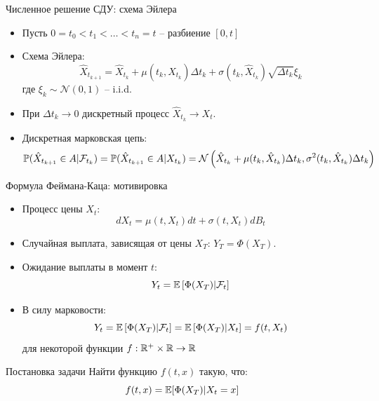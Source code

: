 \documentclass[aspectratio=169]{beamer}
\begin{document}
\begin{frame}{Численное решение СДУ: схема Эйлера}
    
    \begin{itemize}
        \item Пусть $0 = t_0 < t_1 < \ldots < t_n = t$ -- разбиение $[0, t]$
        \item Схема Эйлера:
        $$
            \hat{X}_{t_{k + 1}} = \hat{X}_{t_k} + \mu(t_k, \hat{X}_{t_k}) \Delta t_k + \sigma(t_k, \hat{X}_{t_k}) \sqrt{\Delta t_k} \xi_k
        $$
        где $\xi_k \sim \mathcal{N}(0, 1)$ -- i.i.d.
        \item При $\Delta t_k \to 0$ дискретный процесс $\hat{X}_{t_k} \to X_t$.
        \item Дискретная марковская цепь:
        $$
            \mathbb{P}(\hat{X}_{t_{k + 1}} \in A | \mathcal{F}_{t_k}) = 
            \mathbb{P}(\hat{X}_{t_{k + 1}} \in A | X_{t_k}) =
            \mathcal{N}\left(\hat{X}_{t_k} + \mu(t_k, \hat{X}_{t_k}) \Delta t_k, \sigma^2(t_k, \hat{X}_{t_k}) \Delta t_k\right)
        $$
    \end{itemize}

\end{frame}

\begin{frame}{Формула Феймана-Каца: мотивировка}
    \begin{itemize}
        \item Процесс цены $X_t$:
        $$
            dX_t = \mu(t, X_t) dt + \sigma(t, X_t) dB_t
        $$
        \item Случайная выплата, зависящая от цены $X_T$: $Y_T = \Phi(X_T)$.
        \item Ожидание выплаты в момент $t$:
        $$
            Y_t = \mathbb{E} \left[ \Phi(X_T) | \mathcal{F}_t \right]
        $$
        \item В силу марковости:
        $$
            Y_t = \mathbb{E} \left[ \Phi(X_T) | \mathcal{F}_t \right] = \mathbb{E} \left[ \Phi(X_T) | X_t \right] = f(t, X_t)
        $$для некоторой функции $f : \mathbb{R}^+\times \mathbb{R} \to \mathbb{R}$
    \end{itemize}

    \begin{block}{Постановка задачи}
        Найти функцию $f(t,x)$ такую, что:
        $$
            f(t, x) = \mathbb{E}[\Phi(X_T) | X_t=x]
        $$
    \end{block}

\end{frame}
\end{document}
